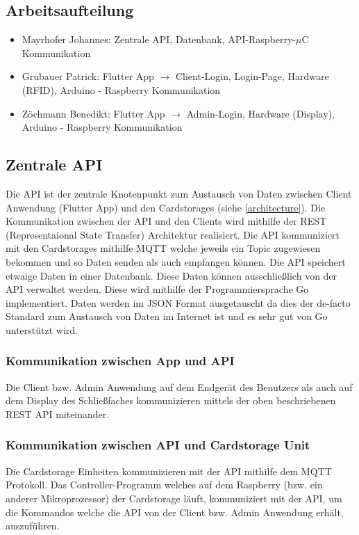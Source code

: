 \documentclass[a4paper]{article}
\begin{document}
\pagebreak

\subsection{Arbeitsaufteilung}
\begin{itemize}
    \item Mayrhofer Johannes: Zentrale API, Datenbank, API-Raspberry-$\mu$C Kommunikation
    \item Grubauer Patrick: Flutter App $\rightarrow$ Client-Login, Login-Page, Hardware (RFID), Arduino - Raspberry Kommunikation
    \item Zöchmann Benedikt: Flutter App $\rightarrow$ Admin-Login, Hardware (Display), Arduino - Raspberry Kommunikation
\end{itemize}

\newpage

\subsection{Zentrale API}
Die API ist der zentrale Knotenpunkt zum Austausch von Daten zwischen Client Anwendung (Flutter App) und den Cardstorages (siehe \autoref{architecture}). Die Kommunikation zwischen der API und den Clients wird mithilfe der REST (Representaional State Transfer) Architektur realisiert. Die API kommuniziert mit den Cardstorages mithilfe MQTT welche jeweils ein Topic zugewiesen bekommen und so Daten senden als auch empfangen können. Die API speichert etwaige Daten in einer Datenbank. Diese Daten können ausschließlich von der API verwaltet werden. Diese wird mithilfe der Programmiersprache Go implementiert. Daten werden im JSON Format ausgetauscht da dies der de-facto Standard zum Austausch von Daten im Internet ist und es sehr gut von Go unterstützt wird.   

\subsubsection{Kommunikation zwischen App und API}
Die Client bzw. Admin Anwendung auf dem Endgerät des Benutzers als auch auf dem Display des Schließfaches kommunizieren mittels der oben beschriebenen REST API miteinander. 

\subsubsection{Kommunikation zwischen API und Cardstorage Unit}
Die Cardstorage Einheiten kommunizieren mit der API mithilfe dem MQTT Protokoll. Das Controller-Programm welches auf dem Raspberry (bzw. ein anderer Mikroprozessor) der Cardstorage läuft, kommuniziert mit der API, um die Kommandos welche die API von der Client bzw. Admin Anwendung erhält, auszuführen.
\end{document}
